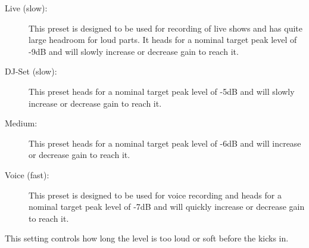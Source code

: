 \begin{description}
{\begin{description}
      \item[Live (slow):]
        This preset is designed to be used for recording of live shows and has
        quite large headroom for loud parts. It heads for a nominal target peak
        level of -9dB and will slowly increase or decrease gain to reach it.
        
      \item[DJ-Set (slow):]
        This preset heads for a nominal target peak level of -5dB and will
        slowly increase or decrease gain to reach it.
        
      \item[Medium:]
        This preset heads for a nominal target peak level of -6dB and will
        increase or decrease gain to reach it.

      \item[Voice (fast):]
        This preset is designed to be used for voice recording and heads for a
        nominal target peak level of -7dB and will quickly increase or
        decrease gain to reach it.
    \end{description}

  \item[AGC clip time:]
    This setting controls how long the level is too loud or soft before the
     kicks in.
}%
\end{description}
